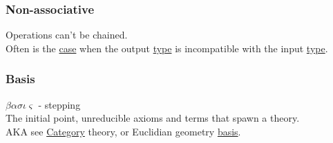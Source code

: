 \documentclass[a4paper,14pt,oneside]{book}
\begin{document}
\subsubsection{\label{orgaf2bc37}Non-associative}
\label{sec:orgeb2d664}
Operations can't be chained.\\

Often is the \hyperref[orgb1cd8b6]{case} when the output \hyperref[org35b9249]{type} is incompatible with the input \hyperref[org35b9249]{type}.\\

\subsubsection{\label{org9cb947f}Basis}
\label{sec:org965e258}
\(\beta\alpha\sigma\iota\varsigma\) - stepping\\

The initial point, unreducible axioms and terms that spawn a theory.\\
AKA see \hyperref[org3a5c6d7]{Category} theory, or Euclidian geometry \hyperref[org9cb947f]{basis}.\\
\end{document}
